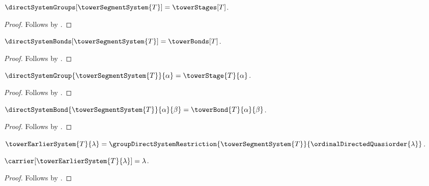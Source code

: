 \begin{proposition}\label{tower_segment_system_groups}
    $\directSystemGroups[\towerSegmentSystem{T}]=\towerStages[T]$.
\end{proposition}
\begin{proof}
    Follows by
        .
\end{proof}

\begin{proposition}\label{tower_segment_system_bonds}
    $\directSystemBonds[\towerSegmentSystem{T}]=\towerBonds[T]$.
\end{proposition}
\begin{proof}
    Follows by
        .
\end{proof}

\begin{proposition}\label{tower_segment_system_group}
    $\directSystemGroup{\towerSegmentSystem{T}}{\alpha}
        =\towerStage{T}{\alpha}$.
\end{proposition}
\begin{proof}
    Follows by
        .
\end{proof}

\begin{proposition}\label{tower_segment_system_bond}
    $\directSystemBond{\towerSegmentSystem{T}}{\alpha}{\beta}
        =\towerBond{T}{\alpha}{\beta}$.
\end{proposition}
\begin{proof}
    Follows by
        .
\end{proof}

\begin{abbreviation}\label{tower_earlier_system}
    $\towerEarlierSystem{T}{\lambda}=
        \groupDirectSystemRestriction
            {\towerSegmentSystem{T}}
            {\ordinalDirectedQuasiorder{\lambda}}$.
\end{abbreviation}

\begin{proposition}\label{tower_earlier_system_carrier}
    $\carrier[\towerEarlierSystem{T}{\lambda}]=\lambda$.
\end{proposition}
\begin{proof}
    Follows by
        .
\end{proof}

